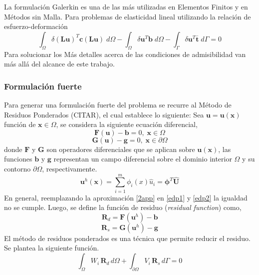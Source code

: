 La formulación Galerkin es una de las más utilizadas en Elementos Finitos y en Métodos sin Malla. Para problemas de elasticidad lineal utilizando la relación de esfuerzo-deformación 
\begin{equation}
    \int_{\Omega} \delta (\bm{L}\bm{u})^T \bm{c} (\bm{L}\bm{u}) \; d\Omega - \int_{\Omega} \delta \bm{u}^T \bm{b} \; d\Omega - \int_{\Gamma} \delta\bm{u}^T \overline{\bm{t}} \; d\Gamma = 0
\end{equation}
Para solucionar los Más detalles acerca de las condiciones de admisibilidad van más allá del alcance de este trabajo. 

\subsubsection{Formulación fuerte}
Para generar una formulación fuerte del problema se recurre al Método de Residuos Ponderados (CITAR), el cual establece lo siguiente: Sea $\bm{u}=\bm{u}(\bm{x})$ función de $\bm{x} \in \Omega$, se considera la siguiente ecuación diferencial,
\begin{equation} \label{edp1} 
    \bm{F}(\bm{u}) - \bm{b} = 0 , \; \bm{x} \in \Omega 
 \end{equation}
\begin{equation} \label{edp2} 
\bm{G}(\bm{u}) - \bm{g} = 0 , \; \bm{x} \in \partial \Omega \end{equation}
donde $\bm{F}$ y $\bm{G}$ son operadores diferenciales que se aplican sobre $\bm{u}(\bm{x})$, las funciones $\bm{b}$ y $\bm{g}$ representan un campo diferencial sobre el dominio interior $\Omega$ y su contorno $\partial \Omega$, respectivamente.
\begin{equation} \label{2app} 
    \bm{u}^h(\bm{x}) = \sum_{i=1}^m \phi_i (x) \hat{u}_i = \bm{\phi}^T \hat{\bm{U}} 
\end{equation}
En general, reemplazando la aproximación \ref{2app} en \ref{edp1} y \ref{edp2} la igualdad no se cumple. Luego, se define la función de residuo (\textit{residual function}) como,
\begin{equation} 
\bm{R}_d = \bm{F}(\bm{u}^h) - \bm{b}  
\end{equation}
\begin{equation}
 \bm{R}_s = \bm{G}(\bm{u}^h) - \bm{g}  
\end{equation}
El método de residuos ponderados es una técnica que permite reducir el residuo. Se plantea la siguiente función.
\begin{equation} \label{eq:residuos_ponderados_1}
 \int_{\Omega} W_i \, \bm{R}_d \, d\Omega + \int_{\partial \Omega} V_i \, \bm{R}_s \, d\Gamma = 0 
 \end{equation}
